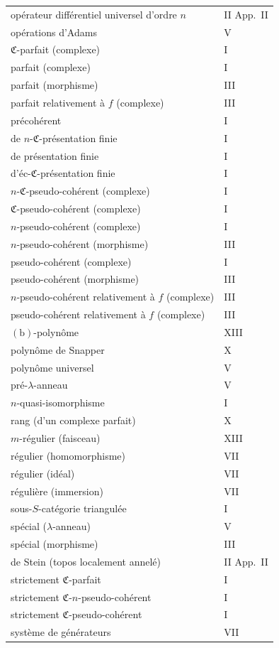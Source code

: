 \begin{longtable}{p{8cm}l}
op\'erateur diff\'erentiel universel d'ordre $n$ & II App.\ II \\
op\'erations d'Adams & V \\
$\mathfrak{C}$-parfait (complexe) & I \\
parfait (complexe) & I \\
parfait (morphisme) & III \\
parfait relativement \`a $f$ (complexe) & III \\
pr\'ecoh\'erent & I \\
de $n$-$\mathfrak{C}$-pr\'esentation finie & I \\
de pr\'esentation finie & I \\
d'\'ec-$\mathfrak{C}$-pr\'esentation finie & I \\
$n$-$\mathfrak{C}$-pseudo-coh\'erent (complexe) & I \\
$\mathfrak{C}$-pseudo-coh\'erent (complexe) & I \\
$n$-pseudo-coh\'erent (complexe) & I \\
$n$-pseudo-coh\'erent (morphisme) & III \\
pseudo-coh\'erent (complexe) & I \\
pseudo-coh\'erent (morphisme) & III \\
$n$-pseudo-coh\'erent relativement \`a $f$ (complexe) & III \\
pseudo-coh\'erent relativement \`a $f$ (complexe) & III \\
$\mathrm{(b)}$-polyn\^ome & XIII \\
polyn\^ome de Snapper & X \\
polyn\^ome universel & V \\
pr\'e-$\lambda$-anneau & V \\
$n$-quasi-isomorphisme & I \\
rang (d'un complexe parfait) & X \\
$m$-r\'egulier (faisceau) & XIII \\
r\'egulier (homomorphisme) & VII \\
r\'egulier (id\'eal) & VII \\
r\'eguli\`ere (immersion) & VII \\
sous-$S$-cat\'egorie triangul\'ee & I \\
sp\'ecial ($\lambda$-anneau) & V \\
sp\'ecial (morphisme) & III \\
de Stein (topos localement annel\'e) & II App.\ II \\
strictement $\mathfrak{C}$-parfait & I \\
strictement $\mathfrak{C}$-$n$-pseudo-coh\'erent & I \\
strictement $\mathfrak{C}$-pseudo-coh\'erent & I \\
syst\`eme de g\'en\'erateurs & VII \\
\bottomrule
\end{longtable}


